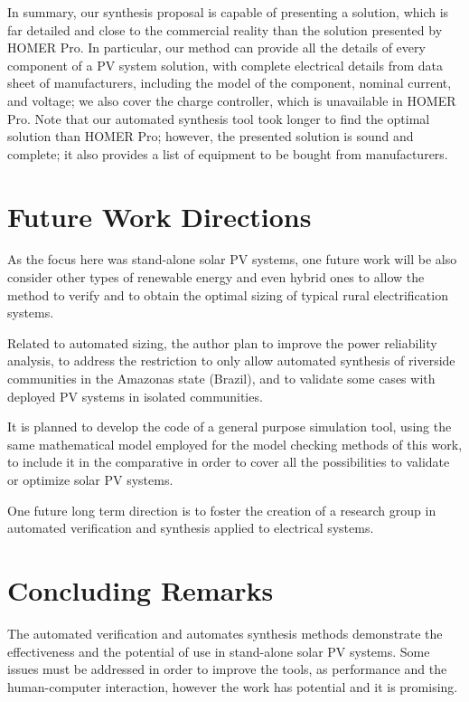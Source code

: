 In summary, our synthesis proposal is capable of presenting a solution, which is far detailed and close to the commercial reality than the solution presented by HOMER Pro. In particular, our method can provide all the details of every component of a PV system solution, with complete electrical details from data sheet of manufacturers, including the model of the component, nominal current, and voltage; we also cover the charge controller, which is unavailable in HOMER Pro. Note that our automated synthesis tool took longer to find the optimal solution than HOMER Pro; however, the presented solution is sound and complete; it also provides a list of equipment to be bought from manufacturers. %


\section{Future Work Directions}

As the focus here was stand-alone solar PV systems, one future work will be also consider other types of renewable energy and even hybrid ones to allow the method to verify and to obtain the optimal sizing of typical rural electrification systems.

Related to automated sizing, the author plan to improve the power reliability analysis, 
to address the restriction to only allow automated synthesis of riverside communities in the Amazonas state (Brazil), and to validate some cases with deployed PV systems in isolated communities.

It is planned to develop the code of a general purpose simulation tool, using the same mathematical model employed for the model checking methods of this work, to include it in the comparative in order to cover all the possibilities to validate or optimize solar PV systems.

One future long term direction is to foster the creation of a research group in automated verification and synthesis applied to electrical systems.


\section{Concluding Remarks}

The automated verification and automates synthesis methods demonstrate the effectiveness and the potential of use in stand-alone solar PV systems. Some issues must be addressed in order to improve the tools, as performance and the human-computer interaction, however the work has potential and it is promising.

